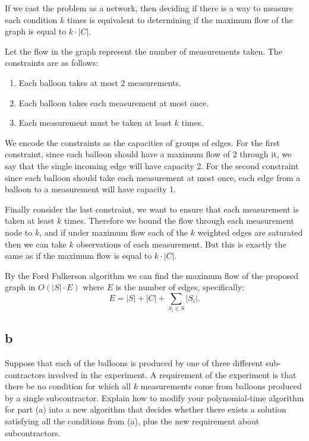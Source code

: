 \documentclass{amsart}
\theoremstyle{definition}
\theoremstyle{remark}
\numberwithin{equation}{section}
\begin{document}
\claimstar If we cast the problem as a network, then deciding if there is a way to measure each condition $k$ times is equivalent to determining if the maximum flow of the graph is equal to $k \cdot |C|$.

\proof
Let the flow in the graph represent the number of measurements taken. The constraints are as follows:

\begin{enumerate}
  \item Each balloon takes at most $2$ measurements.
  \item Each balloon takes each measurement at most once.
  \item Each measurement must be taken at least $k$ times.
\end{enumerate}

We encode the constraints as the capacities of groups of edges. For the first constraint, since each balloon should have a maximum flow of $2$ through it, we say that the single incoming edge will have capacity 2. For the second constraint since each balloon should take each measurement at most once, each edge from a balloon to a measurement will have capacity 1.

Finally consider the last constraint, we want to ensure that each measurement is taken at least $k$ times. Therefore we bound the flow through each measurement node to $k$, and if under maximum flow each of the $k$ weighted edges are saturated then we can take $k$ observations of each measurement. But this is exactly the same as if the maximum flow is equal to $k \cdot |C|$.

\rmkstar By the Ford Fulkerson algorithm we can find the maximum flow of the proposed graph in $O(|S| \cdot E)$ where $E$ is the number of edges, specifically: $$E = |S| + |C| + \sum_{S_i \in S} |S_i|. $$


\subsection*{b}
Suppose that each of the balloons is produced by one of three different sub-contractors involved in the experiment. A requirement of the experiment is that there be no condition for which all $k$ measurements come from balloons produced by a single subcontractor. Explain how to modify your polynomial-time algorithm for part (a) into a new algorithm that decides whether there exists a solution satisfying all the conditions from (a), plus the new requirement about subcontractors. \\
\end{document}

